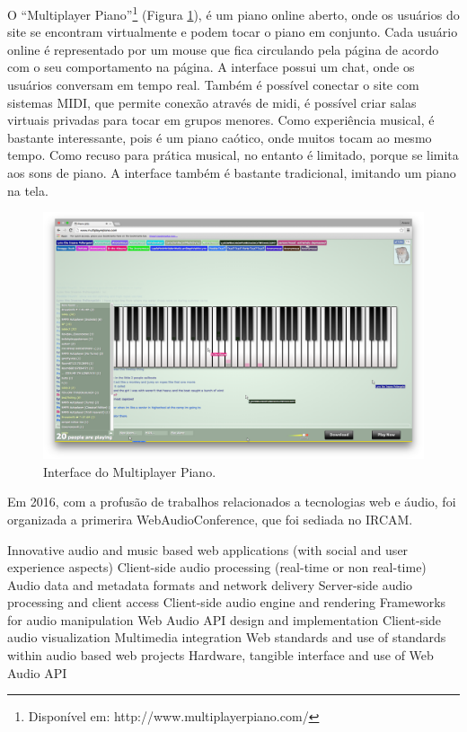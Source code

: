 O ``Multiplayer Piano''\footnote{Disponível em: http://www.multiplayerpiano.com/} (Figura \ref{multiplayer}), é um piano online aberto, onde os usuários do site se encontram virtualmente e podem tocar o piano em conjunto. Cada usuário online é representado por um mouse que fica circulando pela página de acordo com o seu comportamento na página. A interface possui um chat, onde os usuários conversam em tempo real. Também é possível conectar o site com sistemas MIDI, que permite conexão através de midi, é possível criar salas virtuais privadas para tocar em grupos menores. Como experiência musical, é bastante interessante, pois é um piano caótico, onde muitos tocam ao mesmo tempo. Como recuso para prática musical, no entanto é limitado, porque se limita aos sons de piano. A interface também é bastante tradicional, imitando um piano na tela.


\begin{figure}
    \caption{\label{multiplayer}Interface do Multiplayer Piano.}
   
        \includegraphics[width=1\linewidth]{pictures/cap2/multiplayerpiano}
   
\end{figure}

Em 2016, com a profusão de trabalhos relacionados a tecnologias web e áudio, foi organizada a primerira WebAudioConference, que foi sediada no IRCAM. 


Innovative audio and music based web applications (with social and user experience aspects)
Client-side audio processing (real-time or non real-time)
Audio data and metadata formats and network delivery
Server-side audio processing and client access
Client-side audio engine and rendering
Frameworks for audio manipulation
Web Audio API design and implementation
Client-side audio visualization
Multimedia integration
Web standards and use of standards within audio based web projects 
Hardware, tangible interface and use of Web Audio API

